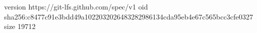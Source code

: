 version https://git-lfs.github.com/spec/v1
oid sha256:c8477c91e3bdd49a1022032026483282986134cda95eb4e67c565bcc3cfe0327
size 19712
